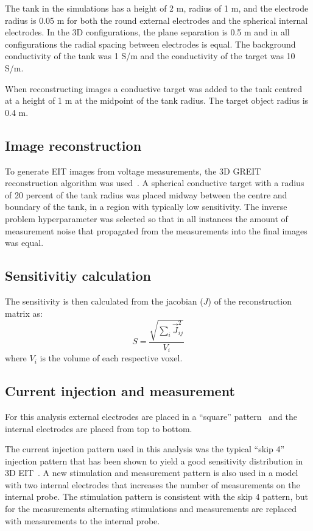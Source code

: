 The tank in the simulations has a height of 2 m, radius of 1 m, and the electrode radius
is 0.05 m for both the round external electrodes and the spherical internal electrodes.
In the 3D configurations, the plane separation is 0.5 m and in all configurations the radial
spacing between electrodes is equal.
The background conductivity of the tank was 1 S/m and the conductivity of the target was
10 S/m.

When reconstructing images a conductive target was added to the tank
centred at a height of 1 m at the midpoint of the tank radius. The target
object radius is 0.4 m.

\subsection{Image reconstruction}

To generate EIT images from voltage measurements, the 3D GREIT
reconstruction algorithm
was used~\parencite{grychtol_3d_2016}. A spherical
conductive target with a radius of 20 percent of the tank radius
was placed midway between the centre and boundary
of the tank, in a region with typically low sensitivity.
The inverse problem hyperparameter
was selected so that in all instances the amount of measurement
noise that propagated from the measurements into the final images
was equal.

\subsection{Sensitivitiy calculation}

The sensitivity is then calculated from the jacobian ($J$) of the reconstruction matrix as:
\begin{equation}
	S = \frac{\sqrt{\sum_{i}\vec{J}_{ij}^2}}{V_i}
\end{equation}
where $V_i$ is the volume of each respective voxel. 

\subsection{Current injection and measurement}
For this analysis external electrodes are placed in 
a ``square'' pattern~\parencite{grychtol_3d_2016} 
and the internal electrodes are placed from top to 
bottom. 

The current injection pattern used in this analysis was the 
typical ``skip 4'' injection pattern that has been shown to yield 
a good sensitivity distribution in 3D EIT~\parencite{grychtol_3d_2016}.
A new stimulation and measurement pattern is also used in a model with 
two internal electrodes that increases
the number of measurements on the internal probe. The stimulation 
pattern is consistent with the skip 4 pattern, but 
for the measurements alternating stimulations and measurements
are replaced with measurements to the internal probe. 


